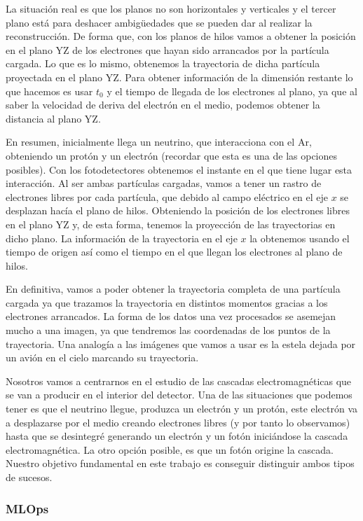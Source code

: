 \documentclass[a4paper,12pt,twoside,titlepage]{article}
\begin{document}
La situación real es que los planos no son horizontales y verticales y el tercer plano está para deshacer ambigüedades que se pueden dar al realizar la reconstrucción. De forma que, con los planos de hilos vamos a obtener la posición en el plano YZ de los electrones que hayan sido arrancados por la partícula cargada. Lo que es lo mismo, obtenemos la trayectoria de dicha partícula proyectada en el plano YZ. Para obtener información de la dimensión restante lo que hacemos es usar $t_0$ y el tiempo de llegada de los electrones al plano, ya que al saber la velocidad de deriva del electrón en el medio, podemos obtener la distancia al plano YZ.

En resumen, inicialmente llega un neutrino, que interacciona con el Ar, obteniendo un protón y un electrón (recordar que esta es una de las opciones posibles). Con los fotodetectores obtenemos el instante en el que tiene lugar esta interacción. Al ser ambas partículas cargadas, vamos a tener un rastro de electrones libres por cada partícula, que debido al campo eléctrico en el eje $x$ se desplazan hacía el plano de hilos. Obteniendo la posición de los electrones libres en el plano YZ y, de esta forma, tenemos la proyección de las trayectorias en dicho plano. La información de la trayectoria en el eje $x$ la obtenemos usando el tiempo de origen así como el tiempo en el que llegan los electrones al plano de hilos.

En definitiva, vamos a poder obtener la trayectoria completa de una partícula cargada ya que trazamos la trayectoria en distintos momentos gracias a los electrones arrancados. La forma de los datos una vez procesados se asemejan mucho a una imagen, ya que tendremos las coordenadas de los puntos de la trayectoria. Una analogía a las imágenes que vamos a usar es la estela dejada por un avión en el cielo marcando su trayectoria.

Nosotros vamos a centrarnos en el estudio de las cascadas electromagnéticas que se van a producir en el interior del detector. Una de las situaciones que podemos tener es que el neutrino llegue, produzca un electrón y un protón, este electrón va a desplazarse por el medio creando electrones libres (y por tanto lo observamos) hasta que se desintegré generando un electrón y un fotón iniciándose la cascada electromagnética. La otro opción posible, es que un fotón origine la cascada. Nuestro objetivo fundamental en este trabajo es conseguir distinguir ambos tipos de sucesos.

\subsubsection*{MLOps}
\end{document}
